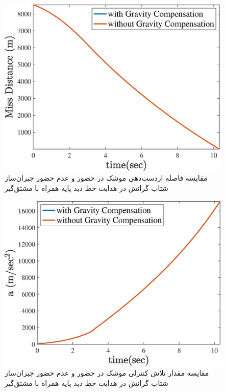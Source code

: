 \begin{figure}[H]
	\centering
	\includegraphics[width=.75\linewidth]{../Figure/e/miss_distance}
	\caption{مقایسه فاصله ازدست‌دهی موشک در حضور و عدم حضور  جبران‌ساز شتاب گرانش در هدایت خط دید پایه همراه با مشتق‌گیر}
\end{figure}

\begin{figure}[H]
	\centering
	\includegraphics[width=.75\linewidth]{../Figure/e/effort}
	\caption{مقایسه مقدار تلاش کنترلی موشک در حضور و عدم حضور  جبران‌ساز شتاب گرانش در هدایت خط دید پایه همراه با مشتق‌گیر}
\end{figure}